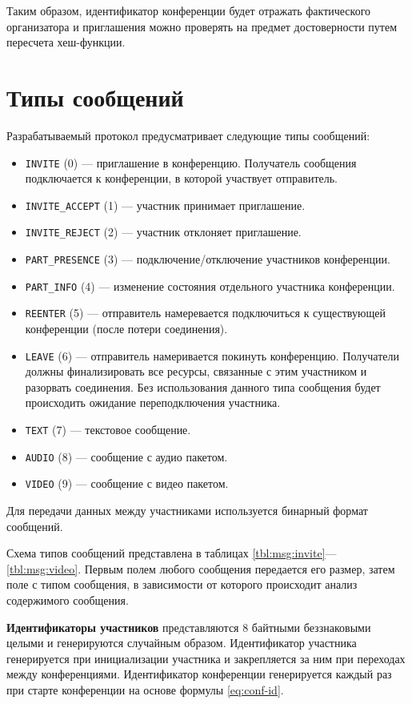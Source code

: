 Таким образом, идентификатор конференции будет отражать фактического организатора и приглашения можно проверять на предмет достоверности путем пересчета хеш-функции.

\section{Типы сообщений}

Разрабатываемый протокол предусматривает следующие типы сообщений:
\begin{itemize}[label=---]
    \item \texttt{INVITE} (0) --- приглашение в конференцию. Получатель сообщения подключается к конференции, в которой участвует отправитель.
    \item \texttt{INVITE\_ACCEPT} (1) --- участник принимает приглашение.
    \item \texttt{INVITE\_REJECT} (2) --- участник отклоняет приглашение.
    \item \texttt{PART\_PRESENCE} (3) --- подключение/отключение участников конференции.
    \item \texttt{PART\_INFO} (4) --- изменение состояния отдельного участника конференции.
    \item \texttt{REENTER} (5) --- отправитель намеревается подключиться к существующей конференции (после потери соединения).
    \item \texttt{LEAVE} (6) --- отправитель намеривается покинуть конференцию. Получатели должны финализировать все ресурсы, связанные с этим участником и разорвать соединения. Без использования данного типа сообщения будет происходить ожидание переподключения участника.
    \item \texttt{TEXT} (7) --- текстовое сообщение.
    \item \texttt{AUDIO} (8) --- сообщение с аудио пакетом.
    \item \texttt{VIDEO} (9) --- сообщение с видео пакетом.
\end{itemize}

Для передачи данных между участниками используется бинарный формат сообщений.

Схема типов сообщений представлена в таблицах \ref{tbl:msg:invite}---\ref{tbl:msg:video}.
Первым полем любого сообщения передается его размер, затем поле с типом сообщения, в зависимости от которого происходит анализ содержимого сообщения.

\textbf{Идентификаторы участников} представляются 8 байтными беззнаковыми целыми и генерируются случайным образом.
Идентификатор участника генерируется при инициализации участника и закрепляется за ним при переходах между конференциями.
Идентификатор конференции генерируется каждый раз при старте конференции на основе формулы \ref{eq:conf-id}.

